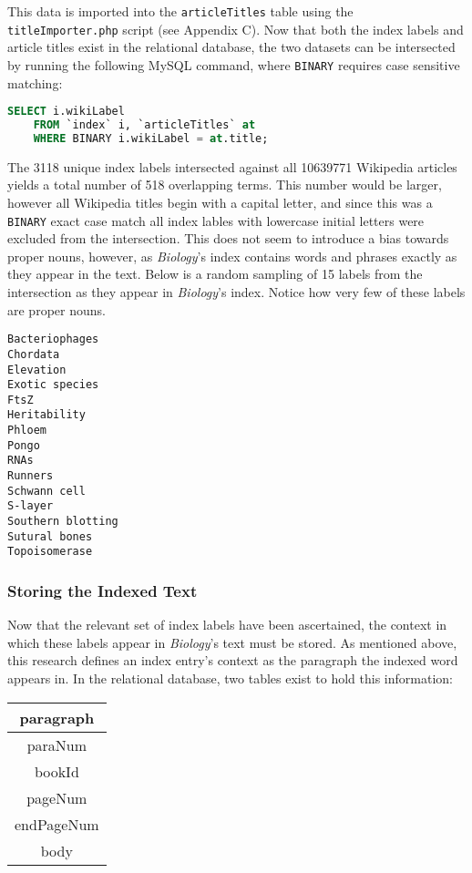 This data is imported into the {\tt articleTitles} table using the {\tt titleImporter.php} script (see Appendix C).
Now that both the index labels and article titles exist in the relational database, the two datasets can be intersected by running the following MySQL command, where {\tt BINARY} requires case sensitive matching:

\begin{lstlisting}[language=SQL]
SELECT i.wikiLabel
    FROM `index` i, `articleTitles` at
    WHERE BINARY i.wikiLabel = at.title;
\end{lstlisting}

The 3118 unique index labels intersected against all 10639771 Wikipedia articles yields a total number of 518 overlapping terms.
This number would be larger, however all Wikipedia titles begin with a capital letter, and since this was a {\tt BINARY} exact case match all index lables with lowercase initial letters were excluded from the intersection.
This does not seem to introduce a bias towards proper nouns, however, as {\it Biology}'s index contains words and phrases exactly as they appear in the text.
Below is a random sampling of 15 labels from the intersection as they appear in {\it Biology}'s index.
Notice how very few of these labels are proper nouns.

\begin{multicols}{3}
\begin{verbatim}
Bacteriophages
Chordata
Elevation
Exotic species
FtsZ
Heritability
Phloem
Pongo
RNAs
Runners
Schwann cell
S-layer
Southern blotting
Sutural bones
Topoisomerase
\end{verbatim}
\end{multicols}

\subsubsection{Storing the Indexed Text}

Now that the relevant set of index labels have been ascertained, the context in which these labels appear in {\it Biology}'s text must be stored.
As mentioned above, this research defines an index entry's context as the paragraph the indexed word appears in.
In the relational database, two tables exist to hold this information:

\begin{center}
\begin{tabular}{|c|}
\hline 
\textbf{paragraph} \\ 
\hline 
paraNum \\ 
\hline 
bookId \\ 
\hline 
pageNum \\ 
\hline 
endPageNum \\ 
\hline 
body \\ 
\hline 
\end{tabular}
\end{center}

